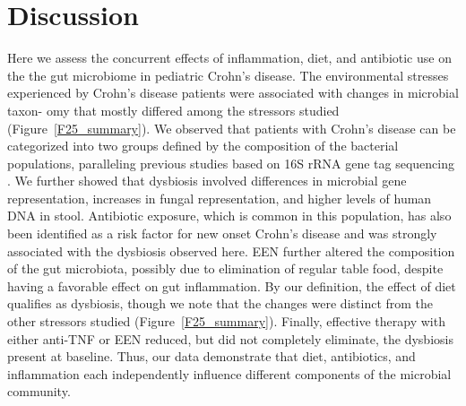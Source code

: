 \section{ Discussion }
Here we assess the concurrent effects of inflammation, diet, and antibiotic use on the the gut microbiome in pediatric Crohn's disease. The environmental stresses experienced by Crohn's disease patients were associated with changes in microbial taxon- omy that mostly differed among the stressors studied (Figure~\ref{F25_summary}). We observed that patients with Crohn's disease can be categorized into two groups defined by the composition of the bacterial populations, paralleling previous studies based on 16S rRNA gene tag sequencing \citep{Frank:2007hn,gevers2014treatment,Tong:2013bp}. We further showed that dysbiosis involved differences in microbial gene representation, increases in fungal representation, and higher levels of human DNA in stool. Antibiotic exposure, which is common in this population, has also been identified as a risk factor for new onset Crohn's disease \citep{Card:2004tb, Margolis:2010et} and was strongly associated with the dysbiosis observed here. EEN further altered the composition of the gut microbiota, possibly due to elimination of regular table food, despite having a favorable effect on gut inflammation. By our definition, the effect of diet qualifies as dysbiosis, though we note that the changes were distinct from the other stressors studied (Figure~\ref{F25_summary}). Finally, effective therapy with either anti-TNF or EEN reduced, but did not completely eliminate, the dysbiosis present at baseline. Thus, our data demonstrate that diet, antibiotics, and inflammation each independently influence different components of the microbial community. 


